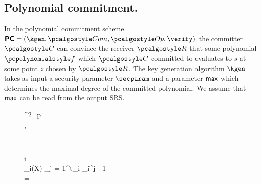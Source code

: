 \documentclass[runningheads,11pt]{llncs}
\begin{document}
\subsection{Polynomial commitment.}
\label{sec:poly_com}
In the polynomial commitment scheme $\PCOM = (\kgen, \com, \open, \verify)$ the
committer $\committer$ can convince the receiver $\receiver$ that some
polynomial $\p{f}$ which $\committer$ committed to evaluates to $s$ at some
point $z$ chosen by $\receiver$.  The key generation algorithm $\kgen$ takes as
input a security parameter $\secparam$ and a parameter $\mathsf{max}$ which
determines the maximal degree of the committed polynomial. We assume that
$\mathsf{max}$ can be read from the output SRS.
%
\begin{figure}[t!]
	\begin{pcvstack}
		\begin{pchstack}
			\procedure{$\kgen(\secparam, \maxdeg)$}
			{
			\chi \sample \FF^2_p \\ [\myskip]
			\pcreturn {}, \gtwo{\chi}\\ [\myskip]
				\hphantom{\hspace*{5.5cm}}	
      }
			
			\pchspace
			
			{ 
				\pcreturn {} = \\ [\myskip]
			}
		\end{pchstack}
    
		\begin{pchstack}
			\procedure{$\open(\srs, \vec{\gamma}, \vec{z}, \vec{s}, \vec{\p{f}}(X))$}
			{
			\pcfor i \in {} \pcdo\\ [\myskip]
      \pcind {}_i(X) \gets \sum_{j = 1}^{t_i} \gamma_i^{j - 1}
      \\ [\myskip] \pcreturn
       = \\ [\myskip]
				\hphantom{\hspace*{5.5cm}}	
			}
			

\end{pchstack}
\end{pcvstack}
\end{figure}
\end{document}
